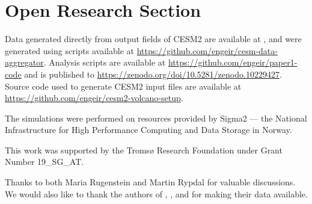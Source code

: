 \documentclass[draft]{agujournal2019}
\begin{document}
%
%

\section*{Open Research Section}


Data generated directly from output fields of CESM2 are available at ,
and were generated using scripts available at
\url{https://github.com/engeir/cesm-data-aggregator}. Analysis scripts are available at
\url{https://github.com/engeir/paper1-code} and is published to
\url{https://zenodo.org/doi/10.5281/zenodo.10229427}. Source code used to generate CESM2
input files are available at \url{https://github.com/engeir/cesm2-volcano-setup}.







\acknowledgments


The simulations were performed on resources provided by Sigma2 --- the National
Infrastructure for High Performance Computing and Data Storage in Norway.

This work was supported by the Tromsø Research Foundation under Grant Number 19\_SG\_AT.

Thanks to both Maria Rugenstein and Martin Rypdal for valuable discussions. We would
also like to thank the authors of , , and
 for making their data available.
\end{document}
